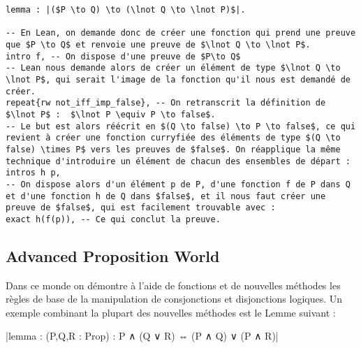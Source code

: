 \begin{verbatim}
lemma : |($P \to Q) \to (\lnot Q \to \lnot P)$|. 

-- En Lean, on demande donc de créer une fonction qui prend une preuve que $P \to Q$ et renvoie une preuve de $\lnot Q \to \lnot P$.
intro f, -- On dispose d'une preuve de $P\to Q$ 
-- Lean nous demande alors de créer un élément de type $\lnot Q \to \lnot P$, qui serait l'image de la fonction qu'il nous est demandé de créer.
repeat{rw not_iff_imp_false}, -- On retranscrit la définition de $\lnot P$ :  $\lnot P \equiv P \to false$.
-- Le but est alors réécrit en $(Q \to false) \to P \to false$, ce qui revient à créer une fonction curryfiée des éléments de type $(Q \to false) \times P$ vers les preuves de $false$. On réapplique la même technique d'introduire un élément de chacun des ensembles de départ : 
intros h p,
-- On dispose alors d'un élément p de P, d'une fonction f de P dans Q et d'une fonction h de Q dans $false$, et il nous faut créer une preuve de $false$, qui est facilement trouvable avec : 
exact h(f(p)), -- Ce qui conclut la preuve. 
\end{verbatim}


\subsection{Advanced Proposition World}
Dans ce monde on démontre à l'aide de fonctions et de nouvelles méthodes les règles de base de la manipulation de consjonctions et disjonctions logiques. Un exemple combinant la plupart des nouvelles méthodes est le Lemme suivant : 


|lemma : (P,Q,R : Prop) : P ∧ (Q ∨ R) ⇔ (P ∧ Q) ∨ (P ∧ R)|

